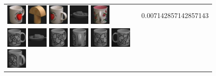 \begin{figure}[tbp]
\begin{center}
\begin{tabular}{m{11cm} | m{3cm} |}
\includegraphics[width=1cm]{coil/beeld-39.eps}
\includegraphics[width=1cm]{coil/beeld-4.eps}
\includegraphics[width=1cm]{coil/beeld-40.eps}
\includegraphics[width=1cm]{coil/beeld-24.eps}
\includegraphics[width=1cm]{coil/beeld-11.eps}
& {\scriptsize 0.007142857142857143}
\\
\includegraphics[width=1cm]{coil/beeld-48.eps}
\includegraphics[width=1cm]{coil/beeld-27.eps}
\includegraphics[width=1cm]{coil/beeld-53.eps}
\includegraphics[width=1cm]{coil/beeld-50.eps}
\includegraphics[width=1cm]{coil/beeld-52.eps}
\includegraphics[width=1cm]{coil/beeld-51.eps}
\includegraphics[width=1cm]{coil/beeld-49.eps}

\end{tabular}
\end{center}
\end{figure}
